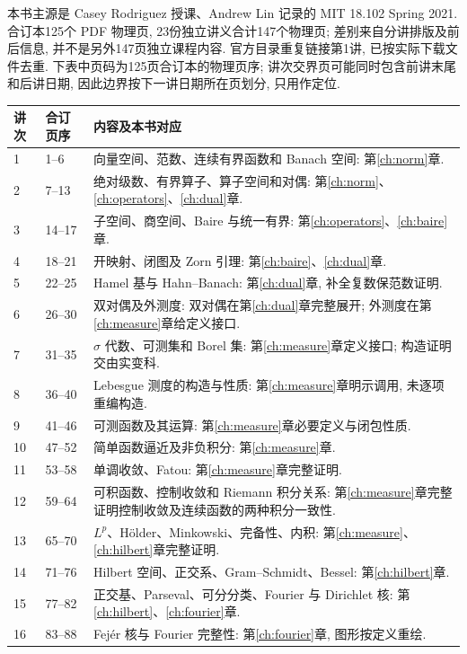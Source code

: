 \label{ch:source}
本书主源是 Casey Rodriguez 授课、Andrew Lin 记录的 MIT 18.102 Spring 2021. 合订本125个 PDF 物理页, 23份独立讲义合计147个物理页; 差别来自分讲排版及前后信息, 并不是另外147页独立课程内容. 官方目录重复链接第1讲, 已按实际下载文件去重. 下表中页码为125页合订本的物理页序; 讲次交界页可能同时包含前讲末尾和后讲日期, 因此边界按下一讲日期所在页划分, 只用作定位.

\begin{longtable}{p{10mm}p{20mm}p{125mm}}
\toprule
讲次 & 合订页序 & 内容及本书对应\\
\midrule
\endhead
1 & 1--6 & 向量空间、范数、连续有界函数和 Banach 空间: 第\ref{ch:norm}章.\\
2 & 7--13 & 绝对级数、有界算子、算子空间和对偶: 第\ref{ch:norm}、\ref{ch:operators}、\ref{ch:dual}章.\\
3 & 14--17 & 子空间、商空间、Baire 与统一有界: 第\ref{ch:operators}、\ref{ch:baire}章.\\
4 & 18--21 & 开映射、闭图及 Zorn 引理: 第\ref{ch:baire}、\ref{ch:dual}章.\\
5 & 22--25 & Hamel 基与 Hahn--Banach: 第\ref{ch:dual}章, 补全复数保范数证明.\\
6 & 26--30 & 双对偶及外测度: 双对偶在第\ref{ch:dual}章完整展开; 外测度在第\ref{ch:measure}章给定义接口.\\
7 & 31--35 & $\sigma$ 代数、可测集和 Borel 集: 第\ref{ch:measure}章定义接口; 构造证明交由实变科.\\
8 & 36--40 & Lebesgue 测度的构造与性质: 第\ref{ch:measure}章明示调用, 未逐项重编构造.\\
9 & 41--46 & 可测函数及其运算: 第\ref{ch:measure}章必要定义与闭包性质.\\
10 & 47--52 & 简单函数逼近及非负积分: 第\ref{ch:measure}章.\\
11 & 53--58 & 单调收敛、Fatou: 第\ref{ch:measure}章完整证明.\\
12 & 59--64 & 可积函数、控制收敛和 Riemann 积分关系: 第\ref{ch:measure}章完整证明控制收敛及连续函数的两种积分一致性.\\
13 & 65--70 & $L^p$、Hölder、Minkowski、完备性、内积: 第\ref{ch:measure}、\ref{ch:hilbert}章完整证明.\\
14 & 71--76 & Hilbert 空间、正交系、Gram--Schmidt、Bessel: 第\ref{ch:hilbert}章.\\
15 & 77--82 & 正交基、Parseval、可分分类、Fourier 与 Dirichlet 核: 第\ref{ch:hilbert}、\ref{ch:fourier}章.\\
16 & 83--88 & Fejér 核与 Fourier 完整性: 第\ref{ch:fourier}章, 图形按定义重绘.\\

\end{longtable}
